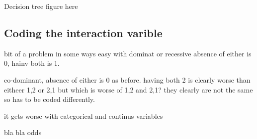 \documentclass[10pt,a4paper]{report}
\begin{document}
Decision tree figure here

\subsection{Coding the interaction varible}
bit of a problem in some ways
easy with dominat or recessive
absence of either is 0, hainv both is 1.

co-dominant, absence of either is 0 as before. having both 2 is clearly worse than eitheer 1,2 or 2,1
but which is worse of 1,2 and 2,1? they clearly are not the same so has to be coded differently.

it gets worse with categorical and continus variables


bla bla odds






\end{document}

